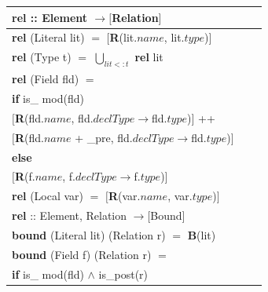 \documentclass[11pt,twoside,a4paper]{book}
\begin{document}
\begin{table}[ht]
  \centering
  
  \begin{tabular}{|l|l|l|}
  \hline
  \rowcolor[gray]{.8}   \textbf{rel} :: Element $\rightarrow [$Relation$]$\\
  \hline
  \hline
  
  \textbf{rel} (Literal lit) \hspace{31mm} $=$ \hspace{2mm} $
  [$\textbf{R}(lit.$name$, lit.$type$)$]$ \\
  \textbf{rel} (Type t)\hspace{37mm} $=$ \hspace{2mm} $ 	\bigcup_{lit<:t}$
  \textbf{rel} lit\\ \textbf{rel} (Field fld) \hspace{33.1mm} $=$ \\
\hspace{2mm}	\textbf{if} is\_ mod(fld)\\
\hspace{10mm} $[$\textbf{R}(fld.$name$, fld.$declType \rightarrow
$fld.$type$)$]$ ++\\ 
\hspace{10mm} $[$\textbf{R}(fld.$name$ + \_pre, fld.$declType \rightarrow
$fld.$type$)$]$\\ 
\hspace{5mm} \textbf{else}\\
\hspace{10mm} $[$\textbf{R}(f.$name$, f.$declType \rightarrow $f.$type$)$]$\\
\textbf{rel} (Local var)\hspace{34mm} $=$ \hspace{2mm} $
[$\textbf{R}(var.$name$, var.$type$)$]$\\
 
  \hline
  \hline
  \rowcolor[gray]{.8}   \textbf{rel} :: Element, Relation $\rightarrow
  [$Bound$]$\\
  \hline
  \hline
  
  \textbf{bound} (Literal lit) (Relation r) \hspace{5.2mm} $=$ \hspace{2mm} 
  \textbf{B}(lit) \\
  \textbf{bound} (Field f) (Relation r) \hspace{10mm} $=$ \\ 
  \hspace{5mm}	\textbf{if} is\_ mod(fld) $\wedge$ is\_post(r)\\


\end{tabular}
\end{table}
\end{document}
